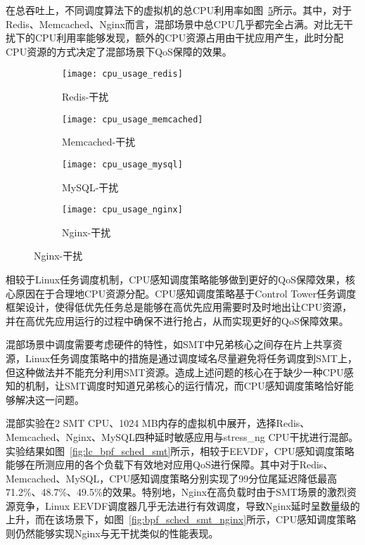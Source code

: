 在总吞吐上，不同调度算法下的虚拟机的总CPU利用率如图~\ref{fig:cpu_usage}所示。其中，对于Redis、Memcached、Nginx而言，混部场景中总CPU几乎都完全占满。对比无干扰下的CPU利用率能够发现，额外的CPU资源占用由干扰应用产生，此时分配CPU资源的方式决定了混部场景下QoS保障的效果。

\begin{figure}[H]
    \centering
    \begin{subfigure}[b]{0.33\textwidth}
        \texttt{[image: cpu\_usage\_redis]}
        \caption{Redis-干扰}
        \label{fig:cpu_usage_redis}
    \end{subfigure}
    \begin{subfigure}[b]{0.33\textwidth}
        \texttt{[image: cpu\_usage\_memcached]}
        \caption{Memcached-干扰}
        \label{fig:cpu_usage_memcached}
    \end{subfigure}
    \begin{subfigure}[b]{0.33\textwidth}
        \texttt{[image: cpu\_usage\_mysql]}
        \caption{MySQL-干扰}
        \label{fig:cpu_usage_mysql}
    \end{subfigure}
    \begin{subfigure}[b]{0.33\textwidth}
        \texttt{[image: cpu\_usage\_nginx]}
        \caption{Nginx-干扰}
        \label{fig:cpu_usage_nginx}
    \end{subfigure}
\label{fig:cpu_usage}
\end{figure}

相较于Linux任务调度机制，CPU感知调度策略能够做到更好的QoS保障效果，核心原因在于合理地CPU资源分配。CPU感知调度策略基于Control Tower任务调度框架设计，使得低优先任务总是能够在高优先应用需要时及时地出让CPU资源，并在高优先应用运行的过程中确保不进行抢占，从而实现更好的QoS保障效果。

混部场景中调度需要考虑硬件的特性，如SMT中兄弟核心之间存在片上共享资源，Linux任务调度策略中的措施是通过调度域名尽量避免将任务调度到SMT上，但这种做法并不能充分利用SMT资源。造成上述问题的核心在于缺少一种CPU感知的机制，让SMT调度时知道兄弟核心的运行情况，而CPU感知调度策略恰好能够解决这一问题。

混部实验在2 SMT CPU、1024 MB内存的虚拟机中展开，选择Redis、Memcached、Nginx、MySQL四种延时敏感应用与stress\_ng CPU干扰进行混部。实验结果如图~\ref{fig:lc_bpf_sched_smt}所示，相较于EEVDF，CPU感知调度策略能够在所测应用的各个负载下有效地对应用QoS进行保障。其中对于Redis、Memcached、MySQL，CPU感知调度策略分别实现了99分位尾延迟降低最高71.2\%、48.7\%、49.5\%的效果。特别地，Nginx在高负载时由于SMT场景的激烈资源竞争，Linux EEVDF调度器几乎无法进行有效调度，导致Nginx延时呈数量级的上升，而在该场景下，如图~\ref{fig:bpf_sched_smt_nginx}所示，CPU感知调度策略则仍然能够实现Nginx与无干扰类似的性能表现。

